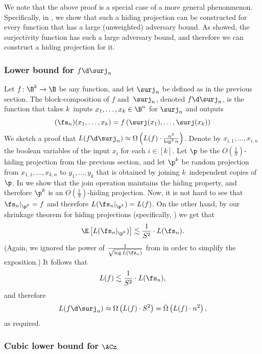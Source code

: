 We note that the above proof is a special case of a more general phenonmenon. Specifically, in ,
we show that such a hiding projection can be constructed for every function that has a large (unweighted) adversary bound. As \cite{BM12} showed, the surjectivity function has such a large adversary bound, and therefore we can construct a hiding projection for it.

\subsubsection{Lower bound for \texorpdfstring{$f\protect\d\protect\surj_{n}$}{f o surj\_n}}

Let $f\colon\B^{k}\to\B$ be any function, and let $\surj_{n}$ be defined
as in the previous section. The block-composition of $f$ and~$\surj_{n}$,
denoted $f\d\surj_{n}$, is the function that takes $k$~inputs $x_{1},\ldots,x_{k}\in\B^{n}$
for $\surj_{n}$ and outputs
\[
(\fs_{n})(x_{1},\ldots,x_{k})=f\left(\surj(x_{1}),\ldots,\surj(x_{k})\right)
\]
We sketch a proof that $L(f\d\surj_{n})\approx\Omega\left(L(f)\cdot\frac{n^{2}}{\log^{2}n}\right)$.
Denote by $x_{i,1},\ldots,x_{i,n}$ the boolean variables of the input
$x_{i}$ for each $i\in\left[k\right]$. Let $\p$ be the $O(\frac{1}{S})$-hiding
projection from the previous section, and let $\p^{k}$ be random
projection from $x_{1,1},\ldots,x_{k,n}$ to $y_{1},\ldots,y_{k}$
that is obtained by joining $k$~independent copies of~$\p$. In
 we show that the join operation maintains the hiding
property, and therefore $\p^{k}$ is an $O(\frac{1}{S})$-hiding projection.
Now, it is not hard to see that $\fs_{n}|_{\p^{k}}=f$ and therefore
$L(\fs_{n}|_{\p^{k}})=L(f)$. On the other hand, by our shrinkage
theorem for hiding projections (specifically, 
)
we get that
\[
\E\left[L(\fs_{n}|_{\p^{k}})\right]\lesssim\frac{1}{S^{2}}\cdot L(\fs_{n}).
\]
(Again, we ignored the power of $\frac{1}{\sqrt{\log L(\fs_{n})}}$
from  in order to simplify the
exposition.) It follows that
\[
L(f)\lesssim\frac{1}{S^{2}}\cdot L(\fs_{n}),
\]
and therefore 
\[
L(f\d\surj_{n})\approx\Omega\left(L(f)\cdot S^{2}\right)=\tilde{\Omega}\left(L(f)\cdot n^{2}\right),
\]
as required.

\subsubsection{Cubic lower bound for \texorpdfstring{$\protect\ACz$}{AC0}}


